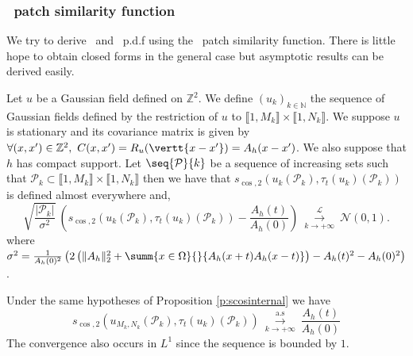 

\subsubsection{\scos \ patch
  similarity function} We try to derive \internalmatching \ and
\templatematching \ p.d.f using the \scos \ patch similarity function. There is
little hope to obtain closed forms in the general case but asymptotic results
can be derived easily.

\begin{prop}
    Let $u$ be a Gaussian field defined on $\mathbb{Z}^2$. We define
  $\left(u_k\right)_{k \in \mathbb{N}}$ the sequence of Gaussian fields
  defined by the restriction of $u$ to $\llbracket 1,M_k \rrbracket \times \llbracket 1,N_k \rrbracket$. We suppose $u$ is
  stationary and its covariance matrix is given by
  $\forall (x,x') \in \mathbb{Z}^2, \ C(x,x') = R_u(\vertt{x-x'}) =
  A_h(x-x')$. We also suppose that $h$ has compact support. Let
  $\seq{\mathcal{P}}{k}$ be a sequence of increasing sets such that
  $\mathcal{P}_k \subset \llbracket 1,M_k \rrbracket \times \llbracket 1,N_k \rrbracket$ then we have that
  $s_{\cos,2}(u_k(\mathcal{P}_k),
  \tau_t\left(u_k\right)(\mathcal{P}_k))$ is defined almost everywhere and,
  \[
    \sqrt{\frac{\vert \mathcal{P}_k \vert}{\sigma^2}} \
    \left(s_{\cos,2}(u_k(\mathcal{P}_k), \tau_t
    \left(u_k\right)(\mathcal{P}_k)) - \frac{A_h(t)}{A_h(0)} \right) \ \overset{\mathcal{L}}{\underset{k
        \rightarrow +\infty}{\longrightarrow}} \ \mathcal{N}(0,1).
  \]
  where
  $\sigma^2 = \frac{1}{A_h(0)^2}\left(2 \left(\|A_h\|_2^2 + \summ{x \in
      \Omega}{}{A_h(x+t)A_h(x-t)}\right) - A_h(t)^2 - A_h(0)^2\right)$.
  \label{p:scosinternal}
\end{prop}
\begin{prop}
  Under the same hypotheses of Proposition \ref{p:scosinternal} we have
  \[ s_{\cos, 2} \left( u_{
        M_k,N_k}(\mathcal{P}_k),\tau_t(u_k)(\mathcal{P}_k)\right) \
    \overset{\text{a.s}}{\underset{k \rightarrow +\infty}{\longrightarrow}} \
    \frac{A_h(t)}{A_h(0)} \]
  The convergence also occurs in $L^1$ since the sequence is bounded by $1$.
\end{prop}

